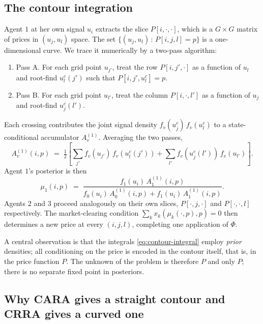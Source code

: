 \documentclass[12pt,letterpaper]{article}
\theoremstyle{definition}
\theoremstyle{remark}
\newcommand{\1}{\mathbf{1}}
\begin{document}
\subsection{The contour integration}

Agent $1$ at her own signal $u_{i}$ extracts the slice $P[i,\cdot,\cdot]$,
which is a $G\times G$ matrix of prices in $(u_{j},u_{l})$ space. The set
\(\bigl\{(u_{j},u_{l})\,:\,P[i,j,l]=p\bigr\}\) is a one-dimensional curve.
We trace it numerically by a two-pass algorithm:
\begin{enumerate}[topsep=2pt,itemsep=2pt]
   \item Pass A. For each grid point $u_{j'}$, treat the row $P[i,j',\cdot]$
         as a function of $u_{l}$ and root-find $u_{l}^{c}(j')$ such that
         $P[i,j',u_{l}^{c}]=p$.
   \item Pass B. For each grid point $u_{l'}$, treat the column $P[i,\cdot,l']$
         as a function of $u_{j}$ and root-find $u_{j}^{c}(l')$.
\end{enumerate}
Each crossing contributes the joint signal density
$f_{v}(u_{j}^{c})\,f_{v}(u_{l}^{c})$ to a state-conditional accumulator
$A_{v}^{(1)}$. Averaging the two passes,
\begin{equation}
   A_{v}^{(1)}(i,p) \;=\;
   \tfrac12 \!\left[\sum_{j'} f_{v}(u_{j'})\,f_{v}(u_{l}^{c}(j'))
                 + \sum_{l'} f_{v}(u_{j}^{c}(l'))\,f_{v}(u_{l'})\right].
\label{eq:contour-integral}
\end{equation}
Agent $1$'s posterior is then
\begin{equation}
   \mu_{1}(i,p) \;=\;
   \frac{f_{1}(u_{i})\,A_{1}^{(1)}(i,p)}
        {f_{0}(u_{i})\,A_{0}^{(1)}(i,p) + f_{1}(u_{i})\,A_{1}^{(1)}(i,p)}.
\label{eq:contour-bayes}
\end{equation}
Agents $2$ and $3$ proceed analogously on their own slices,
$P[\cdot,j,\cdot]$ and $P[\cdot,\cdot,l]$ respectively. The market-clearing
condition $\sum_{k}x_{k}(\mu_{k}(\cdot,p),p)=0$ then determines a new price
at every $(i,j,l)$, completing one application of $\Phi$.

A central observation is that the integrals \eqref{eq:contour-integral}
employ \emph{prior} densities; all conditioning on the price is encoded in
the contour itself, that is, in the price function $P$. The unknown of the
problem is therefore $P$ and only $P$; there is no separate fixed point in
posteriors.

\subsection{Why CARA gives a straight contour and CRRA gives a curved one}
\end{document}
